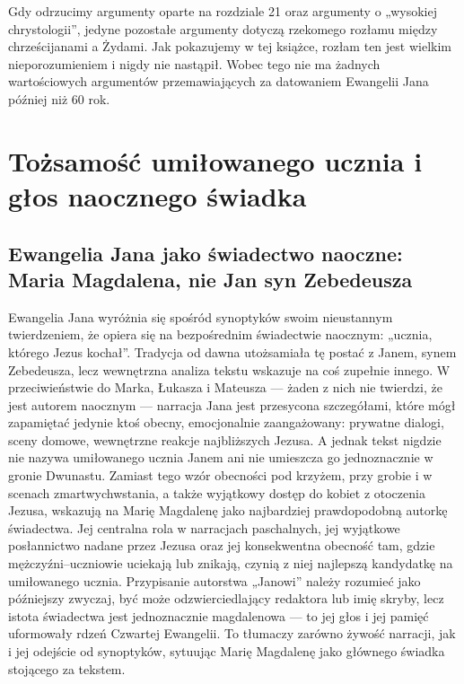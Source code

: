 Gdy odrzucimy argumenty oparte na rozdziale 21 oraz argumenty o „wysokiej chrystologii”, jedyne pozostałe argumenty dotyczą rzekomego rozłamu między chrześcijanami a Żydami.
Jak pokazujemy w tej książce, rozłam ten jest wielkim nieporozumieniem i nigdy nie nastąpił.
Wobec tego nie ma żadnych wartościowych argumentów przemawiających za datowaniem Ewangelii Jana później niż 60 rok.

\section{Tożsamość umiłowanego ucznia i głos naocznego świadka}\label{sec:identity-beloved-disciple}

\subsection{Ewangelia Jana jako świadectwo naoczne: Maria Magdalena, nie Jan syn Zebedeusza}\label{subsec:the-gospel-of-john-is-widely-accepted-to-be-one-gospel-that-indicates-it-was-written-by-an-eyewitness.}

Ewangelia Jana wyróżnia się spośród synoptyków swoim nieustannym twierdzeniem, że opiera się na bezpośrednim świadectwie naocznym: „ucznia, którego Jezus kochał”.
Tradycja od dawna utożsamiała tę postać z Janem, synem Zebedeusza, lecz wewnętrzna analiza tekstu wskazuje na coś zupełnie innego.
W przeciwieństwie do Marka, Łukasza i Mateusza — żaden z nich nie twierdzi, że jest autorem naocznym — narracja Jana jest przesycona szczegółami, które mógł zapamiętać jedynie ktoś obecny, emocjonalnie zaangażowany:
prywatne dialogi, sceny domowe, wewnętrzne reakcje najbliższych Jezusa.
A jednak tekst nigdzie nie nazywa umiłowanego ucznia Janem ani nie umieszcza go jednoznacznie w gronie Dwunastu.
Zamiast tego wzór obecności pod krzyżem, przy grobie i w scenach zmartwychwstania, a także wyjątkowy dostęp do kobiet z otoczenia Jezusa, wskazują na Marię Magdalenę jako najbardziej prawdopodobną autorkę świadectwa.
Jej centralna rola w narracjach paschalnych, jej wyjątkowe posłannictwo nadane przez Jezusa oraz jej konsekwentna obecność tam, gdzie mężczyźni–uczniowie uciekają lub znikają, czynią z niej najlepszą kandydatkę na umiłowanego ucznia.
Przypisanie autorstwa „Janowi” należy rozumieć jako późniejszy zwyczaj, być może odzwierciedlający redaktora lub imię skryby, lecz istota świadectwa jest jednoznacznie magdalenowa — to jej głos i jej pamięć uformowały rdzeń Czwartej Ewangelii.
To tłumaczy zarówno żywość narracji, jak i jej odejście od synoptyków, sytuując Marię Magdalenę jako głównego świadka stojącego za tekstem.

